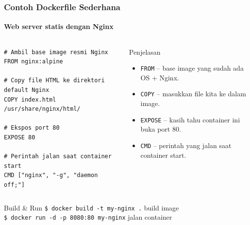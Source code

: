 \documentclass[t,aspectratio=169,xcolor=dvipsnames]{beamer}
\begin{document}
\begin{frame}[fragile, shrink=5]
    \frametitle{Contoh Dockerfile Sederhana}
    \framesubtitle{Web server statis dengan Nginx}

    \tiny
    \begin{columns}[T]
        \begin{lstlisting}[basicstyle=\ttfamily\tiny, breaklines=true]
# Ambil base image resmi Nginx
FROM nginx:alpine

# Copy file HTML ke direktori default Nginx
COPY index.html /usr/share/nginx/html/

# Ekspos port 80
EXPOSE 80

# Perintah jalan saat container start
CMD ["nginx", "-g", "daemon off;"]
        \end{lstlisting}

        \begin{block}{Penjelasan}
            \tiny
            \begin{itemize}
                \item \texttt{FROM} -- base image yang sudah ada OS + Nginx.
                \item \texttt{COPY} -- masukkan file kita ke dalam image.
                \item \texttt{EXPOSE} -- kasih tahu container ini buka port 80.
                \item \texttt{CMD} -- perintah yang jalan saat container start.
            \end{itemize}
        \end{block}
    \end{columns}

    \vspace{0.15cm}
    \begin{exampleblock}{Build \& Run}
        \small
        \texttt{\$ docker build -t my-nginx .} \hfill build image \\
        \texttt{\$ docker run -d -p 8080:80 my-nginx} \hfill jalan container
    \end{exampleblock}
\end{frame}
\end{document}
